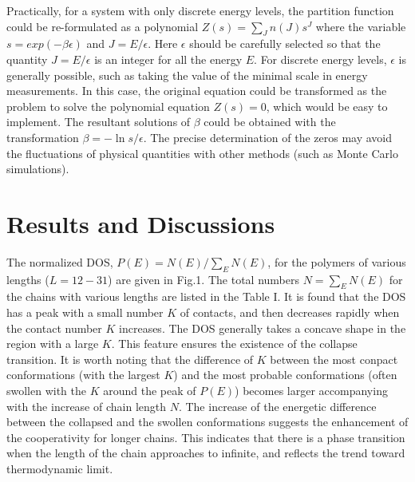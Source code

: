 \documentclass[preprint,preprintnumbers,amsmath,amssymb,showpacs,aps,pre]{revtex4-1}
\begin{document}
Practically, for a system with only discrete energy levels, the partition
function could be
re-formulated as a polynomial $Z(s)=\sum_J n(J) s^J$ where the variable
$s=exp(-\beta\epsilon)$ and $J=E/\epsilon$. Here $\epsilon$ should be carefully
selected so that the quantity $J=E/\epsilon$ is an integer for all the energy
$E$. For discrete energy levels, $\epsilon$ is generally possible, such as
taking the value of the minimal scale in energy measurements. In this case, the
original equation could be transformed as the problem to solve the polynomial
equation $Z(s)=0$, which would be easy to implement. The resultant solutions
of $\beta$ could be obtained with the transformation $\beta=-\ln s/\epsilon$.
The precise determination of the zeros may avoid the fluctuations of physical
quantities with other methods (such as Monte Carlo simulations).

\section{Results and Discussions}

The normalized DOS, $P(E)=N(E)/\sum_E N(E)$, for the polymers of various
lengths ($L=12-31$) are given in Fig.1. The total
numbers $N=\sum_E N(E)$ for the chains with various lengths are listed
in the Table I. It is found that the DOS has a peak with a small number $K$ of
contacts, and then decreases rapidly when the contact number $K$ increases.
The DOS generally takes a concave shape in the region with a large $K$. This
feature ensures the existence of the collapse transition. It is worth noting
that the difference of $K$ between the most conpact conformations (with the
largest $K$) and the most probable conformations (often swollen with the $K$
around the peak of $P(E)$) becomes larger accompanying with the increase of
chain length $N$. The increase of the energetic difference between the
collapsed and the swollen conformations suggests the enhancement of the
cooperativity for longer chains. This indicates that there is a phase
transition when the length of the chain approaches to infinite, and reflects
the trend toward thermodynamic limit.
\end{document}
